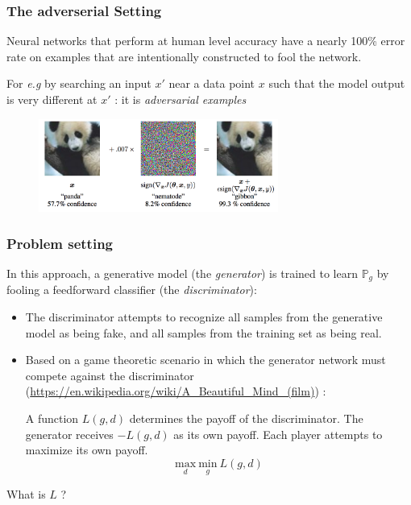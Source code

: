 \documentclass[french,9pt]{beamer}
\begin{document}
\begin{frame}
\frametitle{The adverserial Setting}
Neural networks that perform at human level accuracy have a nearly 100\% error rate on examples that are intentionally constructed to fool the network. 

For \textit{e.g} by searching an input $x'$ near a data point $x$ such that the model output is very different at $x'$ : it is \emph{adversarial examples} \cite{2014arXiv1412.6572G} 
\begin{figure}
  \begin{center}
    \includegraphics[width=0.7\textwidth]{fig/gibon.png}
  \end{center}
\end{figure}


\end{frame}

\begin{frame}
\frametitle{Problem setting}

In this approach, a generative model (the \emph{generator}) is trained to learn $\mathbb{P}_{g}$ by fooling a feedforward classifier (the \emph{discriminator}):
\begin{itemize}
\item The discriminator attempts to recognize all samples from the generative model as being fake, and all samples from the training set as being real.
\item Based on a game theoretic scenario in which the generator network must compete against the discriminator (\url{https://en.wikipedia.org/wiki/A_Beautiful_Mind_(film)}) :

\pause 

A function $L(g ,d)$ determines the payoff of the discriminator. The generator receives $-L(g ,d)$ as its own payoff. Each player attempts to maximize its own payoff.
$$\underset{d}{\text{max}} \ \underset{g}{\text{min}} \ L(g ,d)$$
\end{itemize}

What is $L$ ?

\end{frame}
\end{document}
